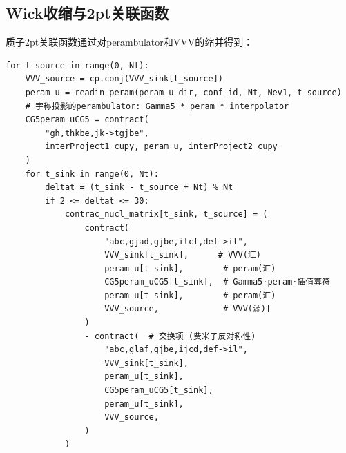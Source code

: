 \documentclass[12pt,a4paper]{ctexart}
\begin{document}
\subsection{Wick收缩与2pt关联函数}

质子2pt关联函数通过对perambulator和VVV的缩并得到：

\begin{codebox}
\begin{lstlisting}[style=pythonstyle]
for t_source in range(0, Nt):
    VVV_source = cp.conj(VVV_sink[t_source])
    peram_u = readin_peram(peram_u_dir, conf_id, Nt, Nev1, t_source)
    # 宇称投影的perambulator: Gamma5 * peram * interpolator
    CG5peram_uCG5 = contract(
        "gh,thkbe,jk->tgjbe",
        interProject1_cupy, peram_u, interProject2_cupy
    )
    for t_sink in range(0, Nt):
        deltat = (t_sink - t_source + Nt) % Nt
        if 2 <= deltat <= 30:
            contrac_nucl_matrix[t_sink, t_source] = (
                contract(
                    "abc,gjad,gjbe,ilcf,def->il",
                    VVV_sink[t_sink],      # VVV(汇)
                    peram_u[t_sink],        # peram(汇)
                    CG5peram_uCG5[t_sink],  # Gamma5·peram·插值算符
                    peram_u[t_sink],        # peram(汇)
                    VVV_source,             # VVV(源)†
                )
                - contract(  # 交换项 (费米子反对称性)
                    "abc,glaf,gjbe,ijcd,def->il",
                    VVV_sink[t_sink],
                    peram_u[t_sink],
                    CG5peram_uCG5[t_sink],
                    peram_u[t_sink],
                    VVV_source,
                )
            )
\end{lstlisting}
\end{codebox}
\end{document}
